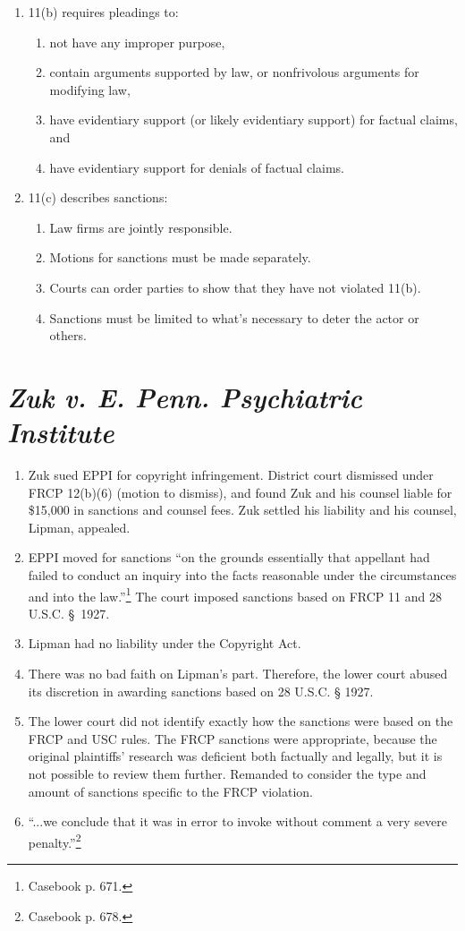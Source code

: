 \begin{enumerate}
    \item 11(b) requires pleadings to:
    \begin{enumerate}
        \item not have any improper purpose,
        \item contain arguments supported by law, or nonfrivolous arguments for modifying law,
        \item have evidentiary support (or likely evidentiary support) for factual claims, and
        \item have evidentiary support for denials of factual claims.
    \end{enumerate}
    \item 11(c) describes sanctions:
    \begin{enumerate}
        \item Law firms are jointly responsible.
        \item Motions for sanctions must be made separately.
        \item Courts can order parties to show that they have not violated 11(b).
        \item Sanctions must be limited to what's necessary to deter the actor or others.
    \end{enumerate}
\end{enumerate}

\section{\emph{Zuk v. E. Penn. Psychiatric Institute}}

\begin{enumerate}
    \item Zuk sued EPPI for copyright infringement. District court dismissed under FRCP 12(b)(6) (motion to dismiss), and found Zuk and his counsel liable for \$15,000 in sanctions and counsel fees. Zuk settled his liability and his counsel, Lipman, appealed.
    \item EPPI moved for sanctions ``on the grounds essentially that appellant had failed to conduct an inquiry into the facts reasonable under the circumstances and into the law.''\footnote{Casebook p. 671.} The court imposed sanctions based on FRCP 11 and 28 U.S.C. § 1927.
    \item Lipman had no liability under the Copyright Act.
    \item There was no bad faith on Lipman's part. Therefore, the lower court abused its discretion in awarding sanctions based on 28 U.S.C. § 1927.
    \item The lower court did not identify exactly how the sanctions were based on the FRCP and USC rules. The FRCP sanctions were appropriate, because the original plaintiffs' research was deficient both factually and legally, but it is not possible to review them further. Remanded to consider the type and amount of sanctions specific to the FRCP violation.
    \item ``...we conclude that it was in error to invoke without comment a very severe penalty.''\footnote{Casebook p. 678.}
\end{enumerate}

